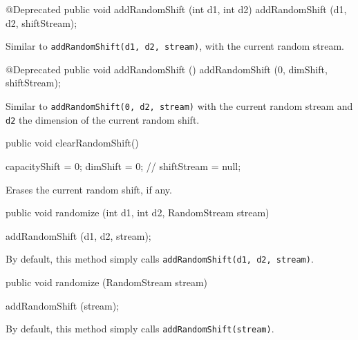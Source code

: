 \begin{hide}\begin{code}

   @Deprecated
   public void addRandomShift (int d1, int d2) {
      addRandomShift (d1, d2, shiftStream);
  }
\end{code}
\begin{tabb} Similar to \texttt{addRandomShift(d1, d2, stream)}, with
  the current random stream.%
\end{tabb}
\begin{code}

   @Deprecated
   public void addRandomShift () {
      addRandomShift (0, dimShift, shiftStream);
   }
\end{code}
\begin{tabb} Similar to \texttt{addRandomShift(0, d2, stream)}
   with  the current random stream and \texttt{d2} the dimension of the current
  random shift.%
\end{tabb}\end{hide}
\begin{code}

   public void clearRandomShift()\begin{hide} {
      capacityShift = 0;
      dimShift = 0;
//      shiftStream = null;
  }\end{hide}
\end{code}
\begin{tabb}
   Erases the current random shift, if any.
\end{tabb}
\begin{code}

   public void randomize (int d1, int d2, RandomStream stream)\begin{hide} {
      addRandomShift (d1, d2, stream);
   }\end{hide}
\end{code}
\begin{tabb} By default, this method simply calls
  \texttt{addRandomShift(d1, d2, stream)}.
\end{tabb}
\begin{code}

   public void randomize (RandomStream stream)\begin{hide} {
      addRandomShift (stream);
  }\end{hide}
\end{code}
\begin{tabb} By default, this method simply calls
   \texttt{addRandomShift(stream)}.
\end{tabb}
